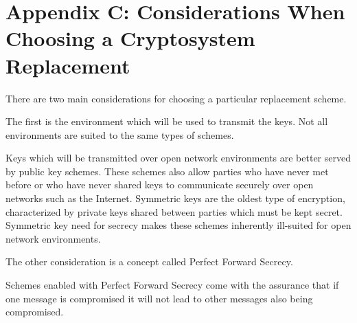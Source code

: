 \section{Appendix C: Considerations When Choosing a Cryptosystem Replacement}

There are two main considerations for choosing a particular replacement scheme. 

The first is the environment which will be used to transmit the keys.  
Not all environments are suited to the same types of schemes.

Keys which will be transmitted over open network environments are better served by public key schemes. 
These schemes also allow parties who have never met before or who have never shared keys to communicate securely over open networks such as the Internet.  
Symmetric keys are the oldest type of encryption, characterized by private keys shared between parties which must be kept secret. 
Symmetric key need for secrecy makes these schemes inherently ill-suited for open network environments. 

The other consideration is a concept called Perfect Forward Secrecy.

Schemes enabled with Perfect Forward Secrecy come with the assurance that if one message is compromised it will not lead to other messages also being compromised.
